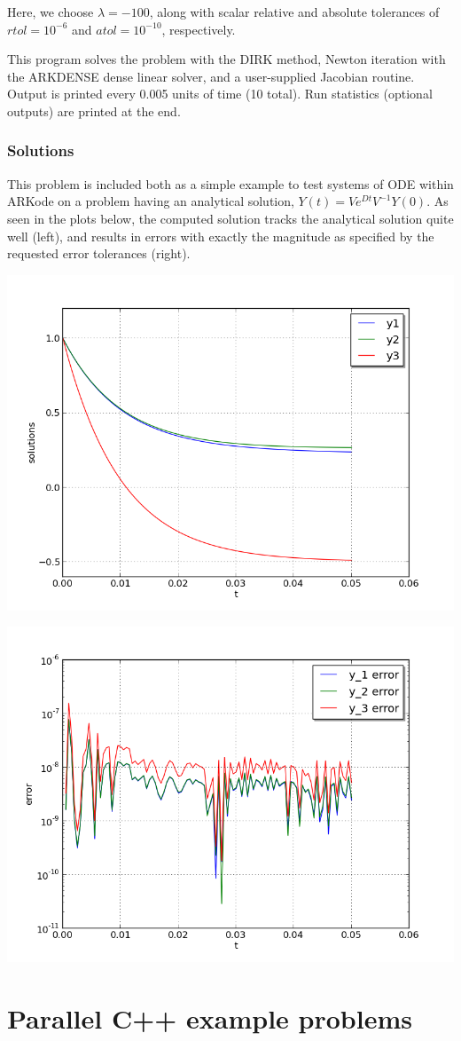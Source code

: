 \documentclass[letterpaper,10pt,english]{sphinxmanual}
\begin{document}
Here, we choose $\lambda = -100$, along with scalar relative and
absolute tolerances of $rtol=10^{-6}$ and $atol=10^{-10}$,
respectively.

This program solves the problem with the DIRK method,
Newton iteration with the ARKDENSE dense linear solver, and a
user-supplied Jacobian routine.
Output is printed every 0.005 units of time (10 total).
Run statistics (optional outputs) are printed at the end.


\subsection{Solutions}
\label{cpp_serial:solutions}
This problem is included both as a simple example to test systems of
ODE within ARKode on a problem having an analytical
solution, $Y(t) = V e^{Dt} V^{-1} Y(0)$.  As
seen in the plots below, the computed solution tracks the analytical
solution quite well (left), and results in errors with exactly the
magnitude as specified by the requested error tolerances (right).

\includegraphics[width=0.450\linewidth]{plot-ark_analytic_sys.png}

\includegraphics[width=0.450\linewidth]{plot-ark_analytic_sys_error.png}


\chapter{Parallel C++ example problems}
\label{cpp_parallel:parallel-cpp}\label{cpp_parallel::doc}\label{cpp_parallel:parallel-c-example-problems}
\end{document}
